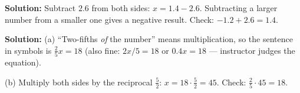 \documentclass[12pt]{article}
\begin{document}

\textbf{Solution:} Subtract $2.6$ from both sides: $x = 1.4 - 2.6$. Subtracting a
larger number from a smaller one gives a negative result. Check:
$-1.2 + 2.6 = 1.4$. \checkmark {}


\textbf{Solution:} (a) ``Two-fifths \emph{of} the number'' means multiplication, so
the sentence in symbols is $\tfrac{2}{5}x = 18$ (also fine: $2x/5 = 18$ or
$0.4x = 18$ --- instructor judges the equation).

(b) Multiply both sides by the reciprocal $\tfrac{5}{2}$:
$x = 18 \cdot \tfrac{5}{2} = 45$. Check: $\tfrac{2}{5} \cdot 45 = 18$.
\checkmark {}
\end{document}
